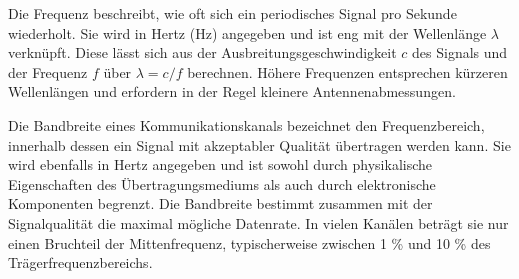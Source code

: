Die Frequenz beschreibt, wie oft sich ein periodisches Signal pro Sekunde wiederholt. Sie wird in Hertz (Hz) angegeben und ist eng mit der Wellenlänge $\lambda$ verknüpft. Diese lässt sich aus der Ausbreitungsgeschwindigkeit $c$ des Signals und der Frequenz $f$ über $\lambda = c / f$ berechnen. Höhere Frequenzen entsprechen kürzeren Wellenlängen und erfordern in der Regel kleinere Antennenabmessungen.

Die Bandbreite eines Kommunikationskanals bezeichnet den Frequenzbereich, innerhalb dessen ein Signal mit akzeptabler Qualität übertragen werden kann. Sie wird ebenfalls in Hertz angegeben und ist sowohl durch physikalische Eigenschaften des Übertragungsmediums als auch durch elektronische Komponenten begrenzt. Die Bandbreite bestimmt zusammen mit der Signalqualität die maximal mögliche Datenrate. In vielen Kanälen beträgt sie nur einen Bruchteil der Mittenfrequenz, typischerweise zwischen 1 \% und 10 \% des Trägerfrequenzbereichs. \autocite[S. 4]{proakisDigitalCommunications2008}
